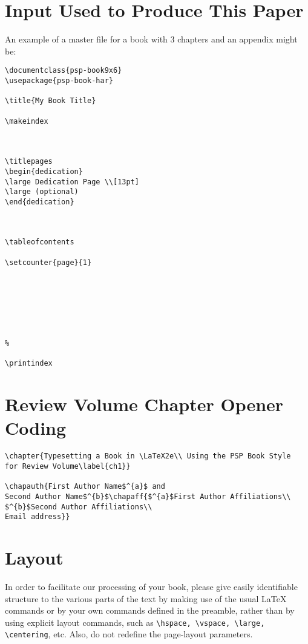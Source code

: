 \section{Input Used to Produce This Paper}
An example of a master file for a book with 3 chapters and an
appendix might be:
\begin{verbatim}
\documentclass{psp-book9x6}
\usepackage{psp-book-har}

\title{My Book Title}

\makeindex



\titlepages
\begin{dedication}
\large Dedication Page \\[13pt]
\large (optional)
\end{dedication}



\tableofcontents

\setcounter{page}{1}







%

\printindex

\end{verbatim}


\section*{Review Volume Chapter Opener Coding}

\begin{verbatim}
\chapter{Typesetting a Book in \LaTeX2e\\ Using the PSP Book Style
for Review Volume\label{ch1}}

\chapauth{First Author Name$^{a}$ and
Second Author Name$^{b}$\chapaff{$^{a}$First Author Affiliations\\
$^{b}$Second Author Affiliations\\
Email address}}

\end{verbatim}



\vfill

\eject

\section{Layout}
In order to facilitate our processing of your book, please give
easily identifiable structure to the various parts of the text by
making use of the usual \LaTeX{} commands or by your own commands
defined in the preamble, rather than by using explicit layout
commands, such as \verb|\hspace, \vspace, \large, \centering|, etc.
Also, do not redefine the page-layout parameters.

